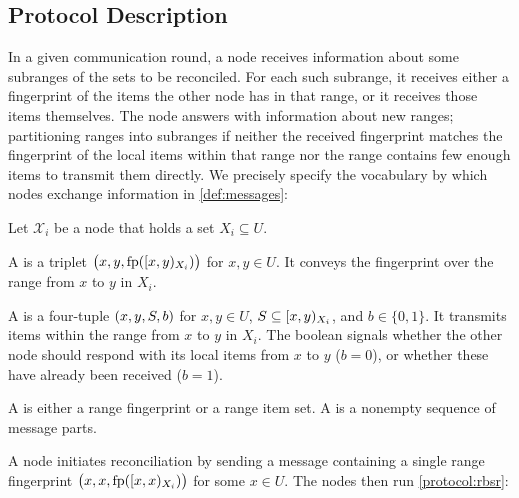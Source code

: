 \documentclass[conference]{IEEEtran}
\newcommand{\peer}[1]{\ensuremath{\mathcal{X}_{#1}}}
\begin{document}

\subsection{Protocol Description}

In a given communication round, a node receives information about some subranges of the sets to be reconciled. For each such subrange, it receives either a fingerprint of the items the other node has in that range, or it receives those items themselves. The node answers with information about new ranges; partitioning ranges into subranges if neither the received fingerprint matches the fingerprint of the local items within that range nor the range contains few enough items to transmit them directly. We precisely specify the vocabulary by which nodes exchange information in \cref{def:messages}:

\begin{definition}
\label{def:messages}
Let \peer{i} be a node that holds a set $X_i \subseteq U$.

A  is a triplet $\bigl({x}, {y}, {\operatorname{fp}([{x},{y})_{X_i})}\bigr)$ for $x, y \in U$. It conveys the fingerprint over the range from $x$ to $y$ in $X_i$.

A  is a four-tuple $({x}, {y}, {S}, {b})$ for $x, y \in U$, $S \subseteq [{x},{y})_{X_i}$, and $b \in \{0, 1\}$. It transmits items within the range from $x$ to $y$ in $X_i$. The boolean signals whether the other node should respond with its local items from $x$ to $y$ ($b = 0$), or whether these have already been received ($b = 1$).
 
A  is either a range fingerprint or a range item set. A  is a nonempty sequence of message parts. 
\end{definition}

\theoremstyle{definition}
\newtheorem{protocol}{Protocol}

A node initiates reconciliation by sending a message containing a single range fingerprint $\bigl({x}, {x}, {\operatorname{fp}([{x},{x})_{X_i})}\bigr)$ for some $x \in U$. The nodes then run \cref{protocol:rbsr}:
\end{document}
